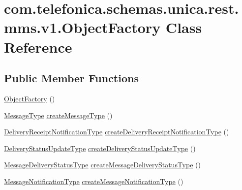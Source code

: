 \hypertarget{classcom_1_1telefonica_1_1schemas_1_1unica_1_1rest_1_1mms_1_1v1_1_1ObjectFactory}{
\section{com.telefonica.schemas.unica.rest.mms.v1.ObjectFactory Class Reference}
\label{classcom_1_1telefonica_1_1schemas_1_1unica_1_1rest_1_1mms_1_1v1_1_1ObjectFactory}
}
\subsection*{Public Member Functions}
\begin{DoxyCompactItemize}
\item 
\hyperlink{classcom_1_1telefonica_1_1schemas_1_1unica_1_1rest_1_1mms_1_1v1_1_1ObjectFactory_ab137a45cbfb9398da0286247c8081088}{ObjectFactory} ()
\item 
\hyperlink{classcom_1_1telefonica_1_1schemas_1_1unica_1_1rest_1_1mms_1_1v1_1_1MessageType}{MessageType} \hyperlink{classcom_1_1telefonica_1_1schemas_1_1unica_1_1rest_1_1mms_1_1v1_1_1ObjectFactory_a285bc7cf34396f0fd601ccce36c422a9}{createMessageType} ()
\item 
\hyperlink{classcom_1_1telefonica_1_1schemas_1_1unica_1_1rest_1_1mms_1_1v1_1_1DeliveryReceiptNotificationType}{DeliveryReceiptNotificationType} \hyperlink{classcom_1_1telefonica_1_1schemas_1_1unica_1_1rest_1_1mms_1_1v1_1_1ObjectFactory_af97d3d452a94bae09e8b3f6d7f7e1f05}{createDeliveryReceiptNotificationType} ()
\item 
\hyperlink{classcom_1_1telefonica_1_1schemas_1_1unica_1_1rest_1_1mms_1_1v1_1_1DeliveryStatusUpdateType}{DeliveryStatusUpdateType} \hyperlink{classcom_1_1telefonica_1_1schemas_1_1unica_1_1rest_1_1mms_1_1v1_1_1ObjectFactory_a605243c8e14c1136e1a3b256873fbd98}{createDeliveryStatusUpdateType} ()
\item 
\hyperlink{classcom_1_1telefonica_1_1schemas_1_1unica_1_1rest_1_1mms_1_1v1_1_1MessageDeliveryStatusType}{MessageDeliveryStatusType} \hyperlink{classcom_1_1telefonica_1_1schemas_1_1unica_1_1rest_1_1mms_1_1v1_1_1ObjectFactory_a39dea2c6323c76ad21eff9011517f87d}{createMessageDeliveryStatusType} ()
\item 
\hyperlink{classcom_1_1telefonica_1_1schemas_1_1unica_1_1rest_1_1mms_1_1v1_1_1MessageNotificationType}{MessageNotificationType} \hyperlink{classcom_1_1telefonica_1_1schemas_1_1unica_1_1rest_1_1mms_1_1v1_1_1ObjectFactory_a7aaef930660f266b2ba25d591fdb5364}{createMessageNotificationType} ()

\end{DoxyCompactItemize}
